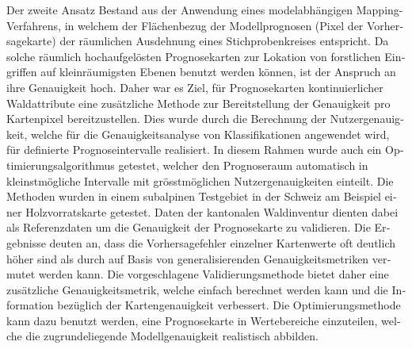 \begin{otherlanguage}{ngerman}
Der zweite Ansatz Bestand aus der Anwendung eines modelabhängigen Mapping-Verfahrens, in welchem der Flächenbezug der Modellprognosen (Pixel der Vorhersagekarte) der räumlichen Ausdehnung eines Stichprobenkreises entspricht. Da solche räumlich hochaufgelösten Prognosekarten zur Lokation von forstlichen Eingriffen auf kleinräumigsten Ebenen benutzt werden können, ist der Anspruch an ihre Genauigkeit hoch. Daher war es Ziel, für Prognosekarten kontinuierlicher Waldattribute eine zusätzliche Methode zur Bereitstellung der Genauigkeit pro Kartenpixel bereitzustellen. Dies wurde durch die Berechnung der Nutzergenauigkeit, welche für die Genauigkeitsanalyse von Klassifikationen angewendet wird, für definierte Prognoseintervalle realisiert. In diesem Rahmen wurde auch ein Optimierungsalgorithmus getestet, welcher den Prognoseraum automatisch in kleinstmögliche Intervalle mit grösstmöglichen Nutzergenauigkeiten einteilt. Die Methoden wurden in einem subalpinen Testgebiet in der Schweiz am Beispiel einer Holzvorratskarte getestet. Daten der kantonalen Waldinventur dienten dabei als Referenzdaten um die Genauigkeit der Prognosekarte zu validieren. Die Ergebnisse deuten an, dass die Vorhersagefehler einzelner Kartenwerte oft deutlich höher sind als durch auf Basis von generalisierenden Genauigkeitsmetriken vermutet werden kann. Die vorgeschlagene Validierungsmethode bietet daher eine zusätzliche Genauigkeitsmetrik, welche einfach berechnet werden kann und die Information bezüglich der Kartengenauigkeit verbessert. Die Optimierungsmethode kann dazu benutzt werden, eine Prognosekarte in Wertebereiche einzuteilen, welche die zugrundeliegende Modellgenauigkeit realistisch abbilden.

\end{otherlanguage}



